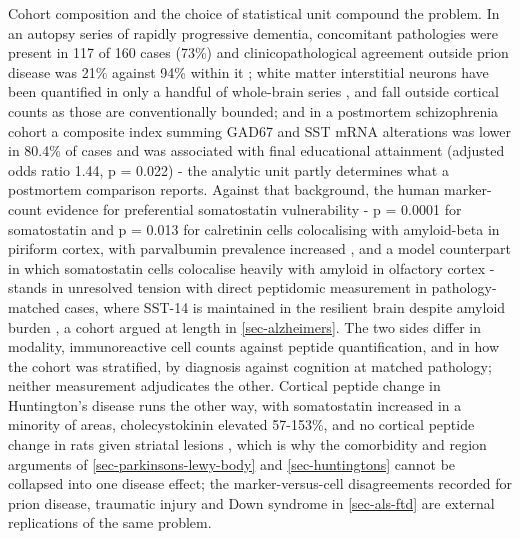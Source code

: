 \documentclass[11pt]{article}
\begin{document}
Cohort composition and the choice of statistical unit compound the problem. In an autopsy series of rapidly progressive dementia, concomitant pathologies were present in 117 of 160 cases (73\%) and clinicopathological agreement outside prion disease was 21\% against 94\% within it \citep{GrauRivera2015}; white matter interstitial neurons have been quantified in only a handful of whole-brain series \citep{Zouridakis2023}, and fall outside cortical counts as those are conventionally bounded; and in a postmortem schizophrenia cohort a composite index summing GAD67 and SST mRNA alterations was lower in 80.4\% of cases and was associated with final educational attainment (adjusted odds ratio 1.44, p = 0.022) \citep{Dienel2025} - the analytic unit partly determines what a postmortem comparison reports. Against that background, the human marker-count evidence for preferential somatostatin vulnerability - p = 0.0001 for somatostatin and p = 0.013 for calretinin cells colocalising with amyloid-beta in piriform cortex, with parvalbumin prevalence increased \citep{SaizSanchez2014}, and a model counterpart in which somatostatin cells colocalise heavily with amyloid in olfactory cortex \citep{SaizSanchez2012} - stands in unresolved tension with direct peptidomic measurement in pathology-matched cases, where SST-14 is maintained in the resilient brain despite amyloid burden \citep{Morgan2024a}, a cohort argued at length in \ref{sec-alzheimers}. The two sides differ in modality, immunoreactive cell counts against peptide quantification, and in how the cohort was stratified, by diagnosis against cognition at matched pathology; neither measurement adjudicates the other. Cortical peptide change in Huntington's disease runs the other way, with somatostatin increased in a minority of areas, cholecystokinin elevated 57-153\%, and no cortical peptide change in rats given striatal lesions \citep{Mazurek1997}, which is why the comorbidity and region arguments of \ref{sec-parkinsons-lewy-body} and \ref{sec-huntingtons} cannot be collapsed into one disease effect; the marker-versus-cell disagreements recorded for prion disease, traumatic injury and Down syndrome in \ref{sec-als-ftd} are external replications of the same problem.
\end{document}
